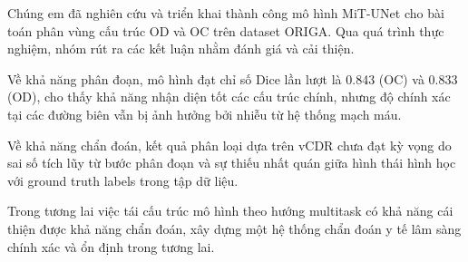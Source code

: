 \documentclass[../DoAn.tex]{subfiles}
\begin{document}
Chúng em đã nghiên cứu và triển khai thành công mô hình MiT-UNet cho bài toán phân vùng cấu trúc OD và OC trên dataset ORIGA. Qua quá trình thực nghiệm, nhóm rút ra các kết luận nhằm đánh giá và cải thiện.

Về khả năng phân đoạn, mô hình đạt chỉ số Dice lần lượt là 0.843 (OC) và 0.833 (OD), cho thấy khả năng nhận diện tốt các cấu trúc chính, nhưng độ chính xác tại các đường biên vẫn bị ảnh hưởng bởi nhiễu từ hệ thống mạch máu.

Về khả năng chẩn đoán, kết quả phân loại dựa trên vCDR chưa đạt kỳ vọng do sai số tích lũy từ bước phân đoạn và sự thiếu nhất quán giữa hình thái hình học với ground truth labels trong tập dữ liệu.

Trong tương lai việc tái cấu trúc mô hình theo hướng multitask có khả năng cái thiện được khả năng chẩn đoán, xây dựng một hệ thống chẩn đoán y tế lâm sàng chính xác và ổn định trong tương lai.
\end{document}
